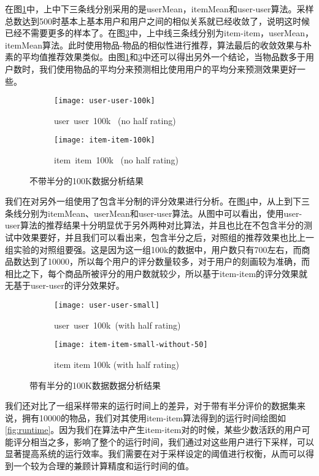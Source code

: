 在图\ref{fig:useruser100k}中，上中下三条线分别采用的是userMean，itemMean和user-user算法。采样总数达到500时基本上基本用户和用户之间的相似关系就已经收敛了，说明这时候已经不需要更多的样本了。在图\ref{fig:itemitem100k}中，上中线三条线分别为item-item，userMean，itemMean算法。此时使用物品-物品的相似性进行推荐，算法最后的收敛效果与朴素的平均值推荐效果类似。由图\ref{fig:useruser100k}和\ref{fig:itemitem100k}中还可以得出另外一个结论，当物品数多于用户数时，我们使用物品的平均分来预测相比使用用户的平均分来预测效果更好一些。
\begin{figure}
\centering
\begin{subfigure}[b]{0.5\textwidth}
\texttt{[image: user-user-100k]}
\caption{user\ user\ 100k \ (no half rating)}
\label{fig:useruser100k}
\end{subfigure}%
\hfill
\begin{subfigure}[b]{0.5\textwidth}
\texttt{[image: item-item-100k]}
\caption{item\ item\ 100k \ (no half rating)}
\label{fig:itemitem100k}
\end{subfigure}
\caption{不带半分的100K数据分析结果}
\end{figure}

我们在对另外一组使用了包含半分制的评分效果进行分析。在图\ref{userusersmall}中，从上到下三条线分别为itemMean、userMean和user-user算法。从图中可以看出，使用user-user算法的推荐结果十分明显优于另外两种对比算法，并且也比在不包含半分的测试中效果要好，并且我们可以看出来，包含半分之后，对照组的推荐效果也比上一组实验的对照组要强。这是因为这一组100k的数据中，用户数只有700左右，而商品数达到了10000，所以每个用户的评分数量较多，对于用户的刻画较为准确，而相比之下，每个商品所被评分的用户数就较少，所以基于item-item的评分效果就无基于user-user的评分效果好。
\begin{figure}
\centering
\begin{subfigure}[b]{0.5\textwidth}
\texttt{[image: user-user-small]}
\caption{user\ user\ 100k\ (with half rating)}\label{userusersmall}
\end{subfigure}%
\hfill
\begin{subfigure}[b]{0.5\textwidth}
\centering
\texttt{[image: item-item-small-without-50]}
\caption{item item 100k (with half rating)}\label{fig:itemitemsmall}
\end{subfigure}
\caption{带有半分的100K数据数据分析结果}
\end{figure}

我们还对比了一组采样带来的运行时间上的差异，对于带有半分评价的数据集来说，拥有10000的物品，我们对其使用item-item算法得到的运行时间绘图如\ref{fig:runtime}。因为我们在算法中产生item-item对的时候，某些少数活跃的用户可能评分相当之多，影响了整个的运行时间，我们通过对这些用户进行下采样，可以显著提高系统的运行效率。我们需要在对于采样设定的阈值进行权衡，从而可以得到一个较为合理的兼顾计算精度和运行时间的值。

